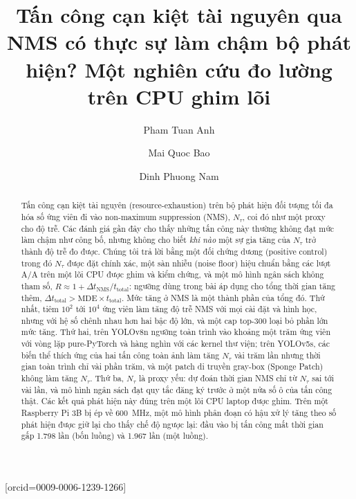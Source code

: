 \documentclass[a4paper,fleqn]{cas-dc}
\newcommand{\Ntau}{N_{\tau}}
\begin{document}
\let\WriteBookmarks\relax
\def\floatpagepagefraction{1}
\def\textpagefraction{.001}
\title[mode=title]{Tấn công cạn kiệt tài nguyên qua NMS có thực sự làm chậm bộ phát hiện? Một nghiên cứu đo lường trên CPU ghim lõi}
\author[1]{Pham Tuan Anh}
\author[1]{Mai Quoc Bao}
\author[1]{Dinh Phuong Nam}[orcid=0009-0006-1239-1266]
\cormark[1]

\begin{abstract}
Tấn công cạn kiệt tài nguyên (resource-exhaustion) trên bộ phát hiện đối tượng tối đa hóa số ứng viên đi vào non-maximum suppression (NMS), $\Ntau$, coi đó như một proxy cho độ trễ. Các đánh giá gần đây cho thấy những tấn công này thường không đạt mức làm chậm như công bố, nhưng không cho biết \emph{khi nào} một sự gia tăng của $\Ntau$ trở thành độ trễ đo được. Chúng tôi trả lời bằng một đối chứng dương (positive control) trong đó $\Ntau$ được đặt chính xác, một sàn nhiễu (noise floor) hiệu chuẩn bằng các lượt A/A trên một lõi CPU được ghim và kiểm chứng, và một mô hình ngân sách không tham số, $R \approx 1+\Delta t_{\mathrm{NMS}}/t_{\mathrm{total}}$: ngưỡng dùng trong bài áp dụng cho tổng thời gian tăng thêm, $\Delta t_{\mathrm{total}} > \mathrm{MDE}\times t_{\mathrm{total}}$. Mức tăng ở NMS là một thành phần của tổng đó. Thứ nhất, tiêm $10^2$ tới $10^4$ ứng viên làm tăng độ trễ NMS với mọi cài đặt và hình học, nhưng với hệ số chênh nhau hơn hai bậc độ lớn, và một cap top-300 loại bỏ phần lớn mức tăng. Thứ hai, trên YOLOv8n ngưỡng toàn trình vào khoảng một trăm ứng viên với vòng lặp pure-PyTorch và hàng nghìn với các kernel thư viện; trên YOLOv5s, các biến thể thích ứng của hai tấn công toàn ảnh làm tăng $\Ntau$ vài trăm lần nhưng thời gian toàn trình chỉ vài phần trăm, và một patch di truyền gray-box (Sponge Patch) không làm tăng $\Ntau$. Thứ ba, $\Ntau$ là proxy yếu: dự đoán thời gian NMS chỉ từ $\Ntau$ sai tới vài lần, và mô hình ngân sách đạt quy tắc đăng ký trước ở một nửa số ô của tấn công thật. Các kết quả phát hiện này đúng trên một lõi CPU laptop được ghim. Trên một Raspberry Pi 3B bị ép về 600~MHz, một mô hình phân đoạn có hậu xử lý tăng theo số phát hiện được giữ lại cho thấy chế độ ngược lại: đầu vào bị tấn công mất thời gian gấp 1.798 lần (bốn luồng) và 1.967 lần (một luồng).
\end{abstract}
\end{document}
